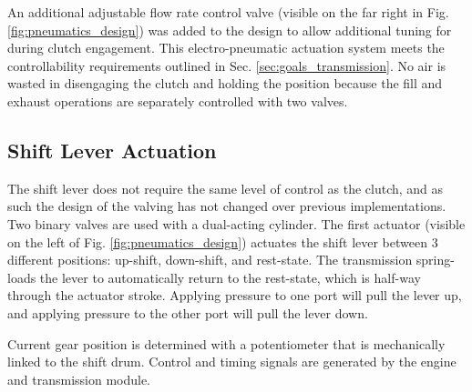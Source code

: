An additional adjustable flow rate control valve (visible on the far right in Fig. \ref{fig:pneumatics_design}) was added to the design to allow additional tuning for during clutch engagement. This electro-pneumatic actuation system meets the controllability requirements outlined in Sec. \ref{sec:goals_transmission}. No air is wasted in disengaging the clutch and holding the position because the fill and exhaust operations are separately controlled with two valves.

\subsection{Shift Lever Actuation}

The shift lever does not require the same level of control as the clutch, and as such the design of the valving has not changed over previous implementations. Two binary valves are used with a dual-acting cylinder. The first actuator (visible on the left of Fig. \ref{fig:pneumatics_design}) actuates the shift lever between 3 different positions: up-shift, down-shift, and rest-state. The transmission spring-loads the lever to automatically return to the rest-state, which is half-way through the actuator stroke. Applying pressure to one port will pull the lever up, and applying pressure to the other port will pull the lever down. 

Current gear position is determined with a potentiometer that is mechanically linked to the shift drum. Control and timing signals are generated by the engine and transmission module.

